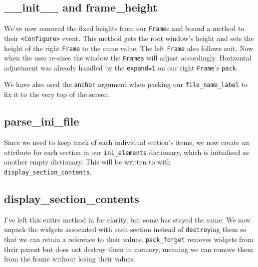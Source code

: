 \documentclass[a4paper,11pt,openany]{book}
\begin{document}
 

\subsection{\_\_init\_\_ and frame\_height}

We've now removed the fixed heights from our \lstinline[columns=fixed]{Frame}s and bound a method to their \lstinline[columns=fixed]{<Configure>} event. This method gets the root window's height and sets the height of the right \lstinline[columns=fixed]{Frame} to the same value. The left \lstinline[columns=fixed]{Frame} also follows suit. Now when the user re-sizes the window the \lstinline[columns=fixed]{Frames} will adjust accordingly. Horizontal adjustment was already handled by the \lstinline[columns=fixed]{expand=1} on our right \lstinline[columns=fixed]{Frame}'s \lstinline[columns=fixed]{pack}.

\vspace{5mm}

We have also used the \lstinline[columns=fixed]{anchor} argument when packing our \lstinline[columns=fixed]{file_name_label} to fix it to the very top of the screen.  

\subsection{parse\_ini\_file}

Since we need to keep track of each individual section's items, we now create an attribute for each section in our \lstinline[columns=fixed]{ini_elements} dictionary, which is initialised as another empty dictionary. This will be written to with \lstinline[columns=fixed]{display_section_contents}.

\subsection{display\_section\_contents}

I've left this entire method in for clarity, but some has stayed the same. We now unpack the widgets associated with each section instead of \lstinline[columns=fixed]{destroy}ing them so that we can retain a reference to their values. \lstinline[columns=fixed]{pack_forget} removes widgets from their parent but does not destroy them in memory, meaning we can remove them from the frame without losing their values. 
\end{document}
